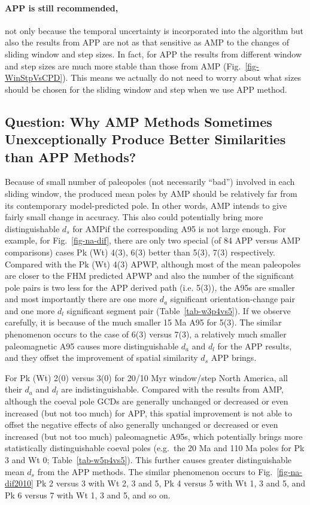 \paragraph{APP is still recommended,} not only because the temporal uncertainty
is incorporated into the algorithm but also the results from APP are not as that
sensitive as AMP to the changes of sliding window and step sizes. In fact, for
APP the results from different window and step sizes are much more stable than
those from AMP (Fig.~\ref{fig-WinStpVsCPD}). This means we actually do not need
to worry about what sizes should be chosen for the sliding window and step when
we use APP method.

\subsection{Question: Why AMP Methods Sometimes Unexceptionally Produce Better
Similarities than APP Methods?}

Because of small number of paleopoles (not necessarily ``bad'') involved in each
sliding window, the produced mean poles by AMP should be relatively far from its
contemporary model-predicted pole. In other words, AMP intends to give fairly
small change in accuracy. This also could potentially bring more distinguishable
$d_s$ for AMP\@ if the corresponding A95 is not large enough. For example, for
Fig.~\ref{fig-na-dif}, there are only two special (of 84 APP versus AMP
comparisons) cases Pk (Wt) 4(3), 6(3) better than 5(3), 7(3) respectively.
Compared with the Pk (Wt) 4(3) APWP, although most of the mean paleopoles are
closer to the FHM predicted APWP and also the number of the significant pole
pairs is two less for the APP derived path (i.e. 5(3)), the A95s are smaller and
most importantly there are one more $d_a$ significant orientation-change pair
and one more $d_l$ significant segment pair (Table~\ref{tab-w3p4vs5}). If we
observe carefully, it is because of the much smaller 15 Ma A95 for 5(3). The
similar phenomenon occurs to the case of 6(3) versus 7(3), a relatively much
smaller paleomagnetic A95 causes more distinguishable $d_a$ and $d_l$ for the
APP results, and they offset the improvement of spatial similarity $d_s$ APP
brings.

For Pk (Wt) 2(0) versus 3(0) for 20/10 Myr window/step North America, all their
$d_a$ and $d_l$ are indistinguishable. Compared with the results from AMP,
although the coeval pole GCDs are generally unchanged or decreased or even
increased (but not too much) for APP, this spatial improvement is not able to
offset the negative effects of also generally unchanged or decreased or even
increased (but not too much) paleomagnetic A95s, which potentially brings more
statistically distinguishable coeval poles (e.g.\ the 20 Ma and 110 Ma poles for
Pk 3 and Wt 0; Table~\ref{tab-w5p4vs5}). This further causes greater
distinguishable mean $d_s$ from the APP methods. The similar phenomenon occurs
to Fig.~\ref{fig-na-dif2010} Pk 2 versus 3 with Wt 2, 3 and 5, Pk 4 versus 5
with Wt 1, 3 and 5, and Pk 6 versus 7 with Wt 1, 3 and 5, and so on.

